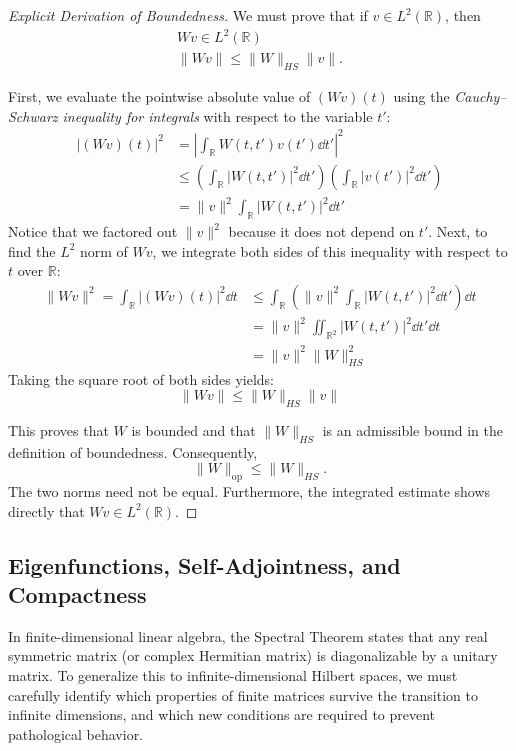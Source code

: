 \begin{proof}[Explicit Derivation of Boundedness]
We must prove that if $v \in L^2(\mathbb{R})$, then
\[
\begin{gathered}
Wv \in L^2(\mathbb{R}) \\
\|Wv\| \leq \|W\|_{HS} \|v\|.
\end{gathered}
\]

First, we evaluate the pointwise absolute value of $(Wv)(t)$ using the \textit{Cauchy--Schwarz inequality for integrals} with respect to the variable $t'$:
\begin{align}
|(Wv)(t)|^2 &= \left| \int_\mathbb{R} W(t, t') v(t') \dd t' \right|^2 \\
    &\leq \left( \int_\mathbb{R} |W(t, t')|^2 \dd t' \right) \left( \int_\mathbb{R} |v(t')|^2 \dd t' \right) \\
    &= \|v\|^2 \int_\mathbb{R} |W(t, t')|^2 \dd t'
\end{align}
Notice that we factored out $\|v\|^2$ because it does not depend on $t'$. Next, to find the $L^2$ norm of $Wv$, we integrate both sides of this inequality with respect to $t$ over $\mathbb{R}$:
\begin{align}
\|Wv\|^2 = \int_\mathbb{R} |(Wv)(t)|^2 \dd t &\leq \int_\mathbb{R} \left( \|v\|^2 \int_\mathbb{R} |W(t, t')|^2 \dd t' \right) \dd t \\
    &= \|v\|^2 \iint_{\mathbb{R}^2} |W(t, t')|^2 \dd t' \dd t \\
    &= \|v\|^2 \|W\|_{HS}^2
\end{align}
Taking the square root of both sides yields:
\begin{equation}
\|Wv\| \leq \|W\|_{HS} \|v\|
\end{equation}

This proves that $W$ is bounded and that $\|W\|_{HS}$ is an admissible
bound in the definition of boundedness. Consequently,
\[
\|W\|_{\mathrm{op}}\leq\|W\|_{HS}.
\]
The two norms need not be equal. Furthermore, the integrated estimate
shows directly that $Wv\in L^2(\mathbb{R})$.
\end{proof}



\subsection{Eigenfunctions, Self-Adjointness, and Compactness}

In finite-dimensional linear algebra, the Spectral Theorem states that any real symmetric matrix (or complex Hermitian matrix) is diagonalizable by a unitary matrix. To generalize this to infinite-dimensional Hilbert spaces, we must carefully identify which properties of finite matrices survive the transition to infinite dimensions, and which new conditions are required to prevent pathological behavior.


